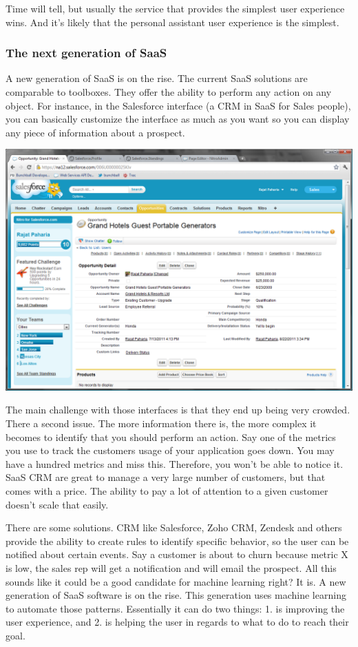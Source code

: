 \documentclass[12pt]{article}
\begin{document}
Time will tell, but usually the service that provides the simplest user
experience wins. And it's likely that the personal assistant user experience is
the simplest.


\subsubsection{The next generation of SaaS}

A new generation of SaaS is on the rise. The current SaaS solutions are
comparable to toolboxes. They offer the ability to perform any action on any
object. For instance, in the Salesforce interface (a CRM in SaaS for Sales
people), you can basically customize the interface as much as you want so you
can display any piece of information about a prospect.


\smallskip
\includegraphics[width=\textwidth]{salesforce}
\smallskip

The main challenge with those interfaces is that they end up being very crowded.
There a second issue. The more information there is, the more complex it becomes
to identify that you should perform an action. Say one of the metrics you use to
track the customers usage of your application goes down. You may have a hundred
metrics and miss this. Therefore, you won't be able to notice it.
SaaS CRM are great to manage a very large number of customers, but that comes
with a price. The ability to pay a lot of attention to a given customer doesn't
scale that easily.

There are some solutions. CRM like Salesforce, Zoho CRM, Zendesk and others
provide the ability to create rules to identify specific behavior, so the user
can be notified about certain events. Say a customer is about to churn because
metric X is low, the sales rep will get a notification and will email the prospect.
All this sounds like it could be a good candidate for machine learning right?
It is. A new generation of SaaS software is on the rise. This generation uses
machine learning to automate those patterns. Essentially it can do two things:
1. is improving the user experience, and
2. is helping the user in regards to what to do to reach their goal.
\end{document}
